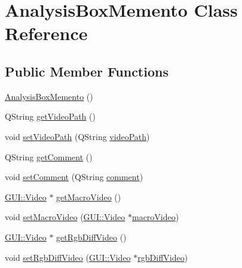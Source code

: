 \hypertarget{classMemento_1_1AnalysisBoxMemento}{}\section{Analysis\+Box\+Memento Class Reference}
\label{classMemento_1_1AnalysisBoxMemento}
\subsection*{Public Member Functions}
\begin{DoxyCompactItemize}
\item 
\hyperlink{classMemento_1_1AnalysisBoxMemento_a2891757dd897d8d7e04f6ac721863e30}{Analysis\+Box\+Memento} ()
\item 
Q\+String \hyperlink{classMemento_1_1AnalysisBoxMemento_a0aee21e65efbd5059679492dcb847281}{get\+Video\+Path} ()
\item 
void \hyperlink{classMemento_1_1AnalysisBoxMemento_a3db0ccff589bc23a3226a0ac59857437}{set\+Video\+Path} (Q\+String \hyperlink{classMemento_1_1AnalysisBoxMemento_afc033233083db464632d21547252969c}{video\+Path})
\item 
Q\+String \hyperlink{classMemento_1_1AnalysisBoxMemento_a8475ee6c96bf1157aa07530f9100416c}{get\+Comment} ()
\item 
void \hyperlink{classMemento_1_1AnalysisBoxMemento_ab3a897eff60f58840c8d1b40292cf047}{set\+Comment} (Q\+String \hyperlink{classMemento_1_1AnalysisBoxMemento_a2651941ce2706f4b08fef7dffdfe89cb}{comment})
\item 
\hyperlink{classGUI_1_1Video}{G\+U\+I\+::\+Video} $\ast$ \hyperlink{classMemento_1_1AnalysisBoxMemento_a3289c4531fb140cc8acd209cd72692f4}{get\+Macro\+Video} ()
\item 
void \hyperlink{classMemento_1_1AnalysisBoxMemento_af927abc830600ab399b02d17109c85b4}{set\+Macro\+Video} (\hyperlink{classGUI_1_1Video}{G\+U\+I\+::\+Video} $\ast$\hyperlink{classMemento_1_1AnalysisBoxMemento_a25f988e50e50ec3e3d41b52b007db0ad}{macro\+Video})
\item 
\hyperlink{classGUI_1_1Video}{G\+U\+I\+::\+Video} $\ast$ \hyperlink{classMemento_1_1AnalysisBoxMemento_a75645527d9cc428280e8432f3cde0314}{get\+Rgb\+Diff\+Video} ()
\item 
void \hyperlink{classMemento_1_1AnalysisBoxMemento_a50210f857928df89e40b97171e1d1486}{set\+Rgb\+Diff\+Video} (\hyperlink{classGUI_1_1Video}{G\+U\+I\+::\+Video} $\ast$\hyperlink{classMemento_1_1AnalysisBoxMemento_a100339bd02ee160a9cd848016e84adc7}{rgb\+Diff\+Video})

\end{DoxyCompactItemize}
